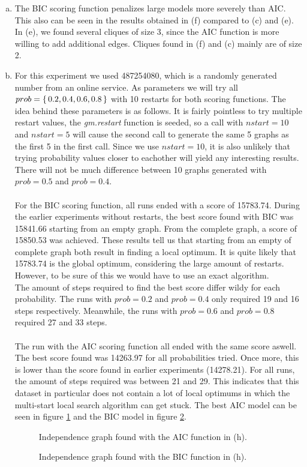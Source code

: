 \documentclass[a4paper,12pt]{scrartcl}
\begin{document}
\begin{enumerate}[(a)]
		\item The BIC scoring function penalizes large models more severely than AIC. This also can be seen in the results obtained in (f) compared to (c) and (e). In (e), we found several cliques of size 3, since the AIC function is more willing to add additional edges. Cliques found in (f) and (c) mainly are of size 2. 
		\item For this experiment we used 487254080, which is a randomly generated number from an online service. As parameters we will try all $prob = \set{0.2, 0.4, 0.6, 0.8}$ with 10 restarts for both scoring functions. The idea behind these parameters is as follows. It is fairly pointless to try multiple restart values, the \textit{gm.restart} function is seeded, so a call with $nstart = 10$ and $nstart = 5$ will cause the second call to generate the same 5 graphs as the first 5 in the first call. Since we use $nstart = 10$, it is also unlikely that trying probability values closer to eachother will yield any interesting results. There will not be much difference between 10 graphs generated with $prob = 0.5$ and $prob = 0.4$. \\ \\
		For the BIC scoring function, all runs ended with a score of 15783.74. During the earlier experiments without restarts, the best score found with BIC was 15841.66 starting from an empty graph. From the complete graph, a score of 15850.53 was achieved. These results tell us that starting from an empty of complete graph both result in finding a local optimum. It is quite likely that 15783.74 is the global optimum, considering the large amount of restarts. However, to be sure of this we would have to use an exact algorithm.
		\\
		The amount of steps required to find the best score differ wildy for each probability. The runs with $prob = 0.2$ and $prob = 0.4$ only required 19 and 16 steps respectively. Meanwhile, the runs with $prob = 0.6$ and $prob = 0.8 $ required 27 and 33 steps. 
		\\\\
		The run with the AIC scoring function all ended with the same score aswell. The best score found was 14263.97 for all probabilities tried. Once more, this is lower than the score found in earlier experiments (14278.21). For all runs, the amount of steps required was between 21 and 29.
		This indicates that this dataset in particular does not contain a lot of local optimums in which the multi-start local search algorithm can get stuck.
		The best AIC model can be seen in figure \ref{fig:h1} and the BIC model in figure \ref{fig:h2}.
		
			\begin{figure}
				\centering
				
				\caption{Independence graph found with the AIC function in (h).}
		        \label{fig:h1}
			\end{figure}

			\begin{figure}
				\centering
				
				\caption{Independence graph found with the BIC function in (h).}
		        \label{fig:h2}
			\end{figure}

	\end{enumerate}
\end{document}
